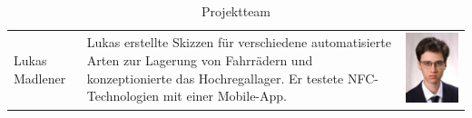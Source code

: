 \begin{table}
\begin{center}
\begin{tabular}{|p{}|p{}|p{}|}
      \hline
      Lukas Madlener & Lukas erstellte Skizzen für verschiedene automatisierte Arten zur Lagerung von Fahrrädern und konzeptionierte das Hochregallager. Er testete NFC-Technologien mit einer Mobile-App. & \begin{minipage}{.3\textwidth}\includegraphics{images/lukasmadlener.jpg} \end{minipage}\\
    \end{tabular}
    \caption{Projektteam}
    \label{tab:projektteam}
    \end{center}
\end{table}